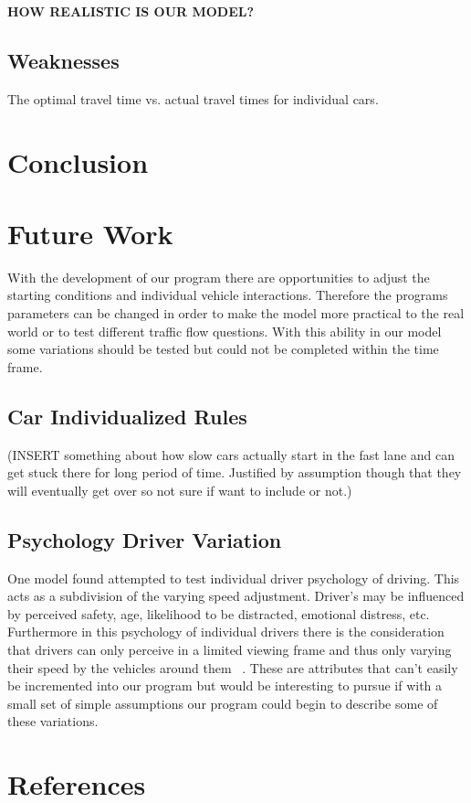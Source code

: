 \documentclass{amsart}
\begin{document}
\textbf{HOW REALISTIC IS OUR MODEL?}

\subsection{Weaknesses}

The optimal travel time vs. actual travel times for individual cars.

  

\section{\bfseries{Conclusion}}

\section{\bfseries{Future Work}}
	With the development of our program there are opportunities to adjust the starting conditions and individual vehicle interactions.  Therefore the programs parameters can be changed in order to make the model more practical to the real world or to test different traffic flow questions.  With this ability in our model some variations should be tested but could not be completed within the time frame.  
	\subsection{Car Individualized Rules}
	(INSERT something about how slow cars actually start in the fast lane and can get stuck there for long period of time. Justified by assumption though that they will eventually get over so not sure if want to include or not.)
	\subsection{Psychology Driver Variation}
	One model found attempted to test individual driver psychology of driving.  This acts as a subdivision of the varying speed adjustment.  Driver's may be influenced by perceived safety, age, likelihood to be distracted, emotional distress, etc.  Furthermore in this psychology of individual drivers there is the consideration that drivers can only perceive in a limited viewing frame and thus only varying their speed by the vehicles around them ~\cite{burghout2005}.  These are attributes that can't easily be incremented into our program but would be interesting to pursue if with a small set of simple assumptions our program could begin to describe some of these variations.     
	
\cite{stone2007introduction}




\newpage
\section{\bfseries{References}}

\end{document}
